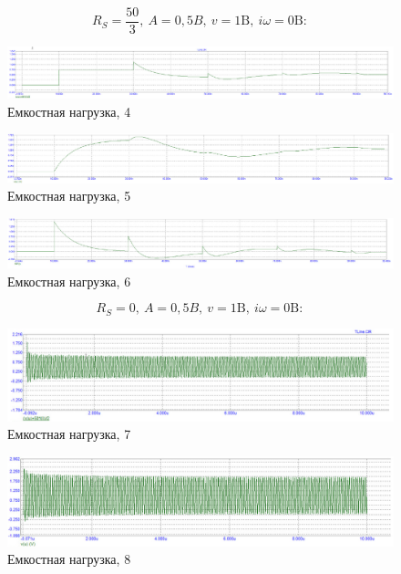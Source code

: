 \documentclass[a4paper, 14pt]{extarticle}%
\begin{document}
\[ R_{S}=\frac{50}{3},\ A=0,5 B,\ v=1 \text{B},\  i \omega=0 \text{B}:\]

\newpage

\begin{figure}[h!]
			\centering
			\includegraphics[width=1.1\linewidth]{./graphs/23.jpg}
			\caption{Емкостная нагрузка, 4}
			\label{5.4}
\end{figure}

\begin{figure}[h!]
			\centering
			\includegraphics[width=1.1\linewidth]{./graphs/24.jpg}
			\caption{Емкостная нагрузка, 5}
			\label{5.5}
\end{figure}

\begin{figure}[h!]
			\centering
			\includegraphics[width=1.1\linewidth]{./graphs/25.jpg}
			\caption{Емкостная нагрузка, 6}
			\label{5.6}
\end{figure}

\[ R_{S}=0,\ A=0,5 B,\ v=1 \text{B},\  i \omega=0 \text{B}:\]

\begin{figure}[h!]
			\centering
			\includegraphics[width=1.1\linewidth]{./graphs/26.jpg}
			\caption{Емкостная нагрузка, 7}
			\label{5.7}
\end{figure}

\newpage 

\begin{figure}[h!]
			\centering
			\includegraphics[width=1.1\linewidth]{./graphs/27.jpg}
			\caption{Емкостная нагрузка, 8}
			\label{5.8}
\end{figure}
\end{document}
